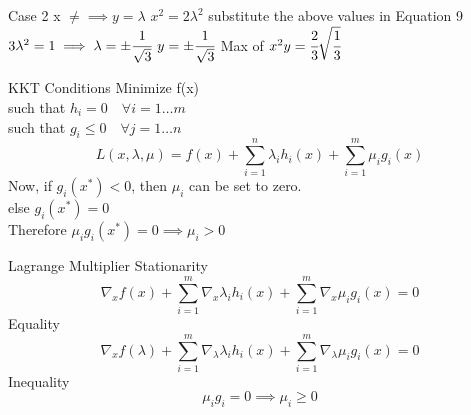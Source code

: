 \documentclass{beamer}
\begin{document}
\begin{frame}{Case 2}
    x $\neq  \implies y = \lambda$
    \vspace{1em}
    $x^{2} = 2\lambda^{2}$ substitute the above values in Equation 9
    \vspace{1em}
    $3\lambda^{2} = 1 \implies \lambda = \pm \cfrac{1}{\sqrt{3}}$
    \vspace{1em}
    $y = \pm \cfrac{1}{\sqrt{3}}$
    \vspace{1em}
    Max of $x^{2}y = \cfrac{2}{3} \sqrt{\cfrac{1}{3}}$
\end{frame}


\begin{frame}{KKT Conditions}
    Minimize f(x)\\
    such that $h_{i} = 0 \hspace{1em} \forall i = 1 \dots m$\\
    such that $g_{i} \leq 0 \hspace{1em} \forall j = 1 \dots n$\\
    
    \begin{equation*}
        L(x,\lambda,\mu)= f(x) + \sum_{i=1}^{n}\lambda_{i}h_{i}(x) + 
        \sum_{i=1}^{m}\mu_{i}g_{i}(x) 
    \end{equation*}
    Now, if $g_{i}(x^{*})<0$, then $\mu_{i}$ can be set to zero.\\
    else  $g_{i}(x^{*})=0$\\
    Therefore $\mu_{i}g_{i}(x^{*})=0 \implies \mu_{i}>0$
\end{frame}


\begin{frame}{Lagrange Multiplier}
    Stationarity\\
    \begin{equation*}
        \nabla_{x}f(x) + \sum_{i=1}^{m} \nabla_{x}\lambda_{i}h_{i}(x)+\sum_{i=1}^{m}\nabla_{x}\mu_{i}g_{i}(x)=0
    \end{equation*}
    Equality
    \begin{equation*}
        \nabla_{x}f(\lambda) + \sum_{i=1}^{m} \nabla_{\lambda}\lambda_{i}h_{i}(x)+\sum_{i=1}^{m}\nabla_{\lambda}\mu_{i}g_{i}(x)=0
    \end{equation*}
    Inequality
    \begin{equation*}
        \mu_{i}g_{i}=0 \implies \mu_{i} \geq 0
    \end{equation*}
\end{frame}
\end{document}
